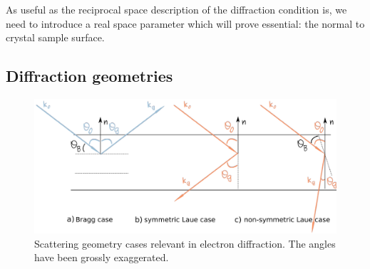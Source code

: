  




As useful as the reciprocal space description of the diffraction condition is, we need to introduce a real space parameter which will prove essential: the normal to crystal sample surface.

%
\subsection{Diffraction geometries}
\label{sec:diffracGeom}
\begin{figure}[ht]
    \centering
\includegraphics[width=0.92\linewidth]{Figures/BraggvsLaue.png}
\caption[Electron diffraction scattering geometry. ]{Scattering geometry cases relevant in electron diffraction. The angles have been grossly exaggerated. }
\label{Fig:BraggvsLaue}
\end{figure}


